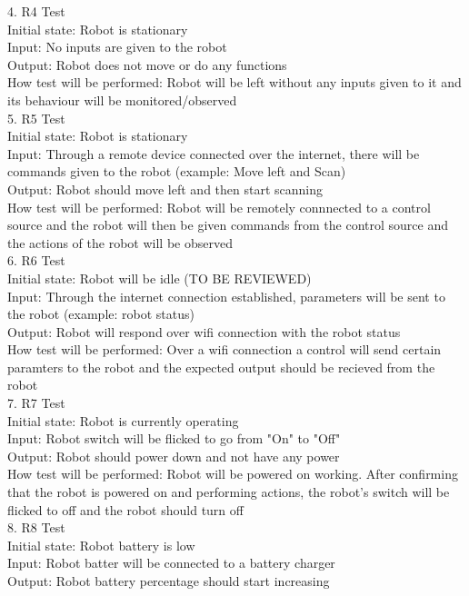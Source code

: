\documentclass[12pt, titlepage]{article}
\begin{document}
\begin{enumerate}
4.	R4 Test \\
Initial state: Robot is stationary \\
Input: No inputs are given to the robot \\
Output: Robot does not move or do any functions \\
How test will be performed: Robot will be left without any inputs given to it and its behaviour will be monitored/observed \\
5.	R5 Test \\
Initial state: Robot is stationary \\
Input: Through a remote device connected over the internet, there will be commands given to the robot (example: Move left and Scan) \\
Output: Robot should move left and then start scanning  \\
How test will be performed: Robot will be remotely connnected to a control source and the robot will then be given commands from the control source and the actions of the robot will be observed \\
6.	R6 Test \\
Initial state: Robot will be idle (TO BE REVIEWED) \\
Input: Through the internet connection established, parameters will be sent to the robot (example: robot status) \\
Output: Robot will respond over wifi connection with the robot status  \\
How test will be performed: Over a wifi connection a control will send certain paramters to the robot and the expected output should be recieved from the robot \\
7.	R7 Test \\
Initial state: Robot is currently operating \\
Input: Robot switch will be flicked to go from "On" to "Off"\\
Output: Robot should power down and not have any power \\
How test will be performed: Robot will be powered on working. After confirming that the robot is powered on and performing actions, the robot's switch will be flicked to off and the robot should turn off \\
8.	R8 Test \\
Initial state: Robot battery is low \\
Input: Robot batter will be connected to a battery charger \\
Output: Robot battery percentage should start increasing \\

\end{enumerate}
\end{document}
